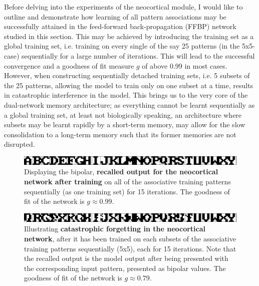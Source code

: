 Before delving into the experiments of the neocortical module, I would like to outline and demonstrate how learning of all pattern associations may be successfully attained in the feed-forward back-propagation (FFBP) network studied in this section. This may be achieved by introducing the training set as a global training set, i.e. training on every single of the say 25 patterns (in the 5x5-case) sequentially for a large number of iterations. This will lead to the successful convergence and a goodness of fit measure $g$ of above 0.99 in most cases. However, when constructing sequentially detached training sets, i.e. 5 subsets of the 25 patterns, allowing the model to train only on one subset at a time, results in catastrophic interference in the model. This brings us to the very core of the dual-network memory architecture; as everything cannot be learnt sequentially as a global training set, at least not biologically speaking, an architecture where subsets may be learnt rapidly by a short-term memory, may allow for the slow consolidation to a long-term memory such that its former memories are not disrupted.

\begin{figure}
    \centering
    \includegraphics[width=13cm]{fig/neo-intro-demo/global_aggregate_im}
    \caption{Displaying the bipolar, \textbf{recalled output for the neocortical network after training} on all of the associative training patterns sequentially (as one training set) for 15 iterations. The goodness of fit of the network is $g\approx0.99$.}
    \label{fig:global_aggregate_im}
\end{figure}

\begin{figure}
    \centering
    \includegraphics[width=13cm]{fig/neo-intro-demo/local_aggregate_im}
    \caption{Illustrating \textbf{catastrophic forgetting in the neocortical network}, after it has been trained on each subsets of the associative training patterns sequentially (5x5), each for 15 iterations. Note that the recalled output is the model output after being presented with the corresponding input pattern, presented as bipolar values. The goodness of fit of the network is $g\approx0.79$.}
    \label{fig:local_aggregate_im}
\end{figure}

